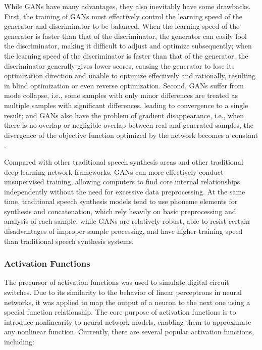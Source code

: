 \documentclass[10pt,journal,compsoc]{IEEEtran}
\begin{document}
While GANs have many advantages, they also inevitably have some drawbacks. First, the training of GANs must effectively control the learning speed of the generator and discriminator to be balanced. When the learning speed of the generator is faster than that of the discriminator, the generator can easily fool the discriminator, making it difficult to adjust and optimize subsequently; when the learning speed of the discriminator is faster than that of the generator, the discriminator generally gives lower scores, causing the generator to lose its optimization direction and unable to optimize effectively and rationally, resulting in blind optimization or even reverse optimization. Second, GANs suffer from mode collapse, i.e., some samples with only minor differences are treated as multiple samples with significant differences, leading to convergence to a single result; and GANs also have the problem of gradient disappearance, i.e., when there is no overlap or negligible overlap between real and generated samples, the divergence of the objective function optimized by the network becomes a constant \cite{8}.

Compared with other traditional speech synthesis areas and other traditional deep learning network frameworks, GANs can more effectively conduct unsupervised training, allowing computers to find core internal relationships independently without the need for excessive data preprocessing. At the same time, traditional speech synthesis models tend to use phoneme elements for synthesis and concatenation, which rely heavily on basic preprocessing and analysis of each sample, while GANs are relatively robust, able to resist certain disadvantages of improper sample processing, and have higher training speed than traditional speech synthesis systems.

\subsubsection{Activation Functions}

The precursor of activation functions was used to simulate digital circuit switches. Due to its similarity to the behavior of linear perceptrons in neural networks, it was applied to map the output of a neuron to the next one using a special function relationship. The core purpose of activation functions is to introduce nonlinearity to neural network models, enabling them to approximate any nonlinear function. Currently, there are several popular activation functions, including:
\end{document}
